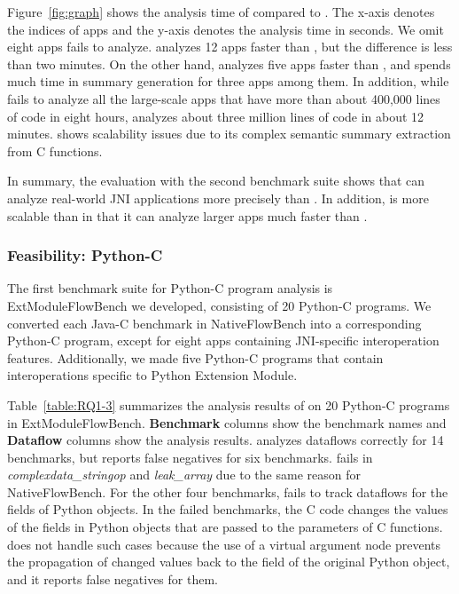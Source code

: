 Figure~\ref{fig:graph} shows the analysis time of \ours compared to \lees.  The
x-axis denotes the indices of apps and the y-axis denotes the analysis time in
seconds. We omit eight apps \lees fails to analyze.  \lees analyzes 12 apps
faster than \ours, but the difference is less than two minutes.  On the other
hand, \ours analyzes five apps faster than \lees, and \lees spends much time in
summary generation for three apps among them.  In addition, while \lees fails
to analyze all the large-scale apps that have more than about 400,000 lines of
code in eight hours, \ours analyzes about three million lines of code in about
12 minutes.  \lees shows scalability issues due to its complex semantic summary
extraction from C functions.

In summary, the evaluation with the second benchmark suite shows that \ours can
analyze real-world JNI applications more precisely than \lees.  In addition,
\ours is more scalable than \lees in that it can analyze larger apps much
faster than \lees.

\subsubsection{Feasibility: Python-C}


The first benchmark suite for Python-C program analysis is ExtModuleFlowBench
we developed, consisting of 20 Python-C programs.  We converted each Java-C
benchmark in NativeFlowBench into a corresponding Python-C program, except for
eight apps containing JNI-specific interoperation features. Additionally, we
made five Python-C programs that contain interoperations specific to Python
Extension Module.

Table~\ref{table:RQ1-3} summarizes the analysis results of \ours on 20 Python-C
programs in ExtModuleFlowBench.  {\bf Benchmark} columns show the benchmark
names and {\bf Dataflow} columns show the analysis results.  \ours analyzes
dataflows correctly for 14 benchmarks, but reports false negatives for six
benchmarks.  \ours fails in {\it complexdata\_stringop} and {\it leak\_array}
due to the same reason for NativeFlowBench.  For the other four benchmarks,
\ours fails to track dataflows for the fields of Python objects.  In the failed
benchmarks, the C code changes the values of the fields in Python objects that
are passed to the parameters of C functions.  \ours does not handle such cases
because the use of a virtual argument node prevents the propagation of changed
values back to the field of the original Python object, and it reports false
negatives for them.

